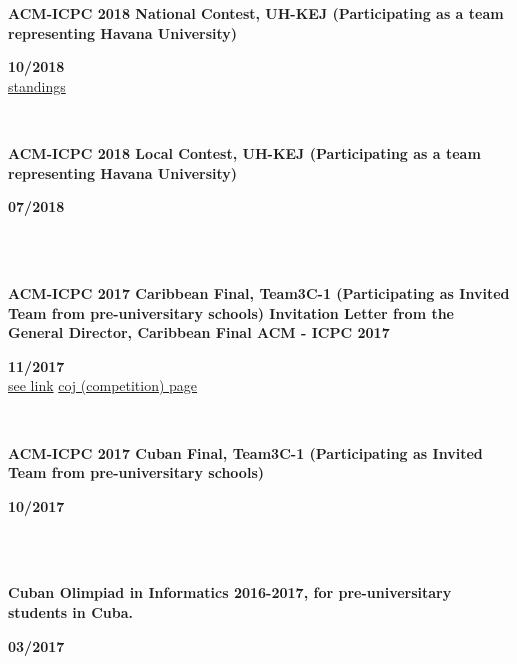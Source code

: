 \begin{minipage}{0.8\textwidth}
    \parbox{0.8\linewidth}{\textbf{ACM-ICPC 2018 National Contest, UH-KEJ (Participating as a team representing Havana University)} }\hfill \textbf{10/2018}\\
    \href{https://icpc.global/regionals/finder/cnc-2018/standings}{standings}
    \\
\end{minipage} \hfill {}\\
\begin{minipage}{0.8\textwidth}
    \parbox{0.8\linewidth}{\textbf{ACM-ICPC 2018 Local Contest, UH-KEJ  (Participating as a team representing Havana University)}} \hfill \textbf{07/2018}\\
    \\
\end{minipage} \hfill {}\\
\begin{minipage}{0.8\textwidth}
    \parbox{0.8\linewidth}{\textbf{ACM-ICPC 2017 Caribbean Final, Team3C-1 (Participating as  Invited Team from pre-universitary schools)
    Invitation Letter from the General Director, Caribbean Final ACM - ICPC 2017}} \hfill \textbf{11/2017}\\
    \href{https://matcomgrader.com/post/5167/the-2017-acm-icpc-caribbean-finals}{see link}
    \href{https://coj-forum.uci.cu/viewtopic.php?t=3315}{coj (competition) page}
    \\
\end{minipage} \hfill {}\\
\begin{minipage}{0.8\textwidth}
    \parbox{0.8\linewidth}{\textbf{ACM-ICPC 2017 Cuban Final, Team3C-1 (Participating as  Invited Team from pre-universitary schools)}} \hfill \textbf{10/2017}\\
    \\
\end{minipage}\\
\begin{minipage}{0.8\textwidth}
    \parbox{0.8\linewidth}{\textbf{Cuban Olimpiad in Informatics 2016-2017, for pre-universitary students in Cuba.}} \hfill \textbf{03/2017}\\
    \\
\end{minipage}\\
